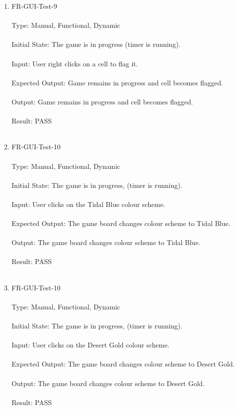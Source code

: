 \documentclass[12pt, titlepage]{article}
\begin{document}
\begin{enumerate}
\item{FR-GUI-Test-9\\\\}
Type: Manual, Functional, Dynamic\\\\				
Initial State: The game is in progress (timer is running).\\\\
Input: User right clicks on a cell to flag it.\\\\
Expected Output: Game remains in progress and cell becomes flagged.\\\\
Output: Game remains in progress and cell becomes flagged.\\\\
Result: PASS\\\\

\newpage
\item{FR-GUI-Test-10\\\\}
Type: Manual, Functional, Dynamic\\\\				
Initial State: The game is in progress, (timer is running).\\\\
Input: User clicks on the Tidal Blue colour scheme.\\\\
Expected Output: The game board changes colour scheme to Tidal Blue.\\\\
Output: The game board changes colour scheme to Tidal Blue.\\\\
Result: PASS\\\\

\item{FR-GUI-Test-10\\\\}
Type: Manual, Functional, Dynamic\\\\				
Initial State: The game is in progress, (timer is running).\\\\
Input: User clicks on the Desert Gold colour scheme.\\\\
Expected Output: The game board changes colour scheme to Desert Gold.\\\\
Output: The game board changes colour scheme to Desert Gold.\\\\
Result: PASS\\\\


\end{enumerate}
\end{document}
